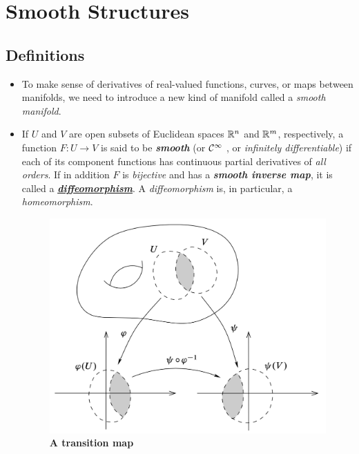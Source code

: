 \documentclass[11pt]{article}
\begin{document}
%

\section{Smooth Structures}
\subsection{Definitions}
\begin{itemize}
\item To make sense of derivatives of real-valued functions, curves, or maps between manifolds, we need to introduce a new kind of manifold called a \emph{smooth manifold}.

\item \begin{definition}
If $U$ and $V$ are open subsets of Euclidean spaces ${\mathbb R}^n$ and ${\mathbb R}^m$, respectively, a function $F: U \rightarrow V$ is said to be \emph{\textbf{smooth}} (or ${\mathcal C}^{\infty}$ , or \emph{infinitely differentiable}) if each of its component functions has continuous partial derivatives of \emph{all orders}. If in addition $F$ is \emph{bijective} and has a \emph{\textbf{smooth inverse map}}, it is called a \underline{\emph{\textbf{diffeomorphism}}}. A \emph{diffeomorphism} is, in particular, a \emph{homeomorphism}.
\end{definition}

\begin{figure}
\begin{minipage}[t]{1\linewidth}
  \centering
  \centerline{\includegraphics[scale = 0.4]{transition_map.png}}
\end{minipage}
\caption{\footnotesize{\textbf{A transition map \citep{lee2003introduction}}}}
\label{fig: transition_map}
\end{figure}



\end{itemize}
\end{document}
